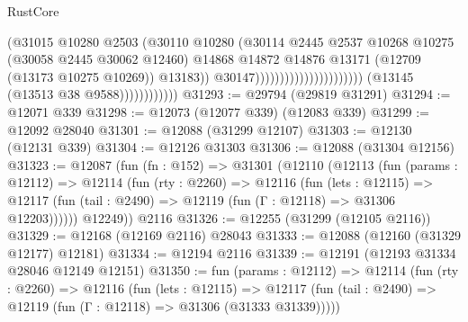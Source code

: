 \begin{lexlean}{RustCore}
\begin{coremodule}
                                                                  (@31015
                                                                    @10280
                                                                    @2503
                                                                    (@30110
                                                                      @10280
                                                                      (@30114
                                                                        @2445
                                                                        @2537
                                                                        @10268
                                                                        @10275
                                                                        (@30058 @2445 @30062 @12460)
                                                                        @14868
                                                                        @14872
                                                                        @14876
                                                                        @13171
                                                                        (@12709
                                                                          (@13173 @10275 @10269))
                                                                        @13183))
                                                                    @30147))))))))))))))))))))))
                        (@13145 (@13513 @38 @9588))))))))))))
@31293 := @29794 (@29819 @31291)
@31294 := @12071 @339
@31298 := @12073 (@12077 @339) (@12083 @339)
@31299 := @12092 @28040
@31301 := @12088 (@31299 @12107)
@31303 := @12130 (@12131 @339)
@31304 := @12126 @31303
@31306 := @12088 (@31304 @12156)
@31323 := @12087
    (fun (fn : @152) =>
    @31301
      (@12110
        (@12113
          (fun (params : @12112) =>
          @12114
            (fun (rty : @2260) =>
            @12116
              (fun (lets : @12115) =>
              @12117 (fun (tail : @2490) => @12119 (fun (Γ : @12118) => @31306 @12203))))))
        @12249))
    @2116
@31326 := @12255 (@31299 (@12105 @2116))
@31329 := @12168 (@12169 @2116) @28043
@31333 := @12088 (@12160 (@31329 @12177) @12181)
@31334 := @12194 @2116
@31339 := @12191 (@12193 @31334 @28046 @12149 @12151)
@31350 := fun (params : @12112) =>
  @12114
    (fun (rty : @2260) =>
    @12116
      (fun (lets : @12115) =>
      @12117 (fun (tail : @2490) => @12119 (fun (Γ : @12118) => @31306 (@31333 @31339)))))

\end{coremodule}
\end{lexlean}
